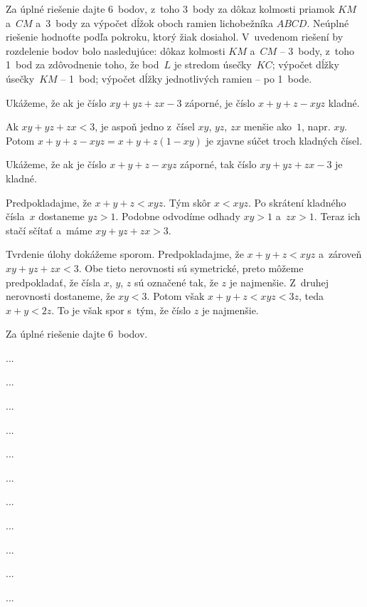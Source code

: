 {\nobreak\medskip\petit\noindent
Za úplné riešenie dajte 6~bodov, z~toho 3~body za dôkaz kolmosti priamok $KM$
a~$CM$ a~3~body za výpočet dĺžok oboch ramien lichobežníka $ABCD$.
Neúplné riešenie hodnoťte podľa pokroku, ktorý žiak dosiahol. V~uvedenom riešení
by rozdelenie bodov bolo nasledujúce:
dôkaz kolmosti $KM$ a~$CM$ -- 3~body, z~toho 1~bod za zdôvodnenie toho, že
bod~$L$ je stredom úsečky~$KC$;
výpočet dĺžky úsečky~$KM$ -- 1~bod;
výpočet dĺžky jednotlivých ramien -- po 1~bode.
\endpetit
\bigbreak
}

{%
Ukážeme, že ak je číslo $xy+yz+zx-3$ záporné, je číslo $x+y+z-xyz$ kladné.

Ak $xy+yz+zx<3$, je aspoň jedno z~čísel $xy$, $yz$, $zx$ menšie ako~$1$,
napr. $xy$. Potom $x+y+z-xyz=x+y+z(1-xy)$ je zjavne súčet troch kladných čísel.

\ineriesenie
Ukážeme, že ak je číslo $x+y+z-xyz$ záporné, tak číslo $xy+yz+zx-3$ je
kladné.

Predpokladajme, že $x+y+z < xyz$. Tým skôr $x < xyz$. Po skrátení kladného
čísla~$x$ dostaneme $yz > 1$.
Podobne odvodíme odhady $xy > 1$ a~$zx > 1$. Teraz ich stačí sčítať a~máme
$xy+yz+zx > 3$.

\ineriesenie
Tvrdenie úlohy dokážeme sporom.
Predpokladajme, že $x+y+z < xyz$ a~zároveň $xy+yz+zx < 3$. Obe tieto
nerovnosti sú symetrické, preto môžeme predpokladať, že čísla $x$, $y$, $z$
sú označené tak, že $z$ je najmenšie. Z~druhej nerovnosti dostaneme, že
$xy< 3$. Potom však $x+y+z < xyz < 3z$, teda $x + y < 2z$. To je však spor s~tým, že
číslo $z$ je najmenšie.

\nobreak\medskip\petit\noindent
Za úplné riešenie dajte 6~bodov.
\endpetit
\bigbreak
}

{%
...}

{%
...}

{%
...}

{%
...}

{%
...}

{%
...}

{%
...}

{%
...}

{%
...}

{%
...}

{%
...}

